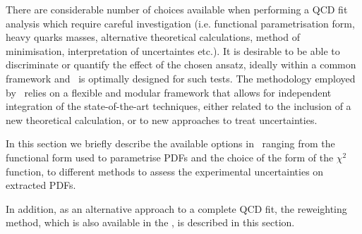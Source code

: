 



There are considerable number of choices available when performing a QCD fit analysis which require careful investigation (i.e. functional parametrisation form, heavy quarks masses, alternative theoretical calculations, method of minimisation, interpretation of uncertaintes etc.).
%
 It is desirable to be able to discriminate or quantify the effect of the chosen ansatz,  ideally within a common framework and 
\fitter\ is optimally designed for such tests.
%
The methodology employed by \fitter\  relies on a flexible and modular
framework that allows for independent integration of the state-of-the-art techniques, either related to the inclusion of a new theoretical calculation, or to new approaches to treat uncertainties. 
%

In this section we briefly describe the available options in \fitter\ ranging from the functional form used to parametrise PDFs and the choice of the form of the $\chi^2$ function, to different methods to assess the experimental uncertainties on extracted PDFs.

In addition, as an alternative approach to a complete QCD fit,  the reweighting
method, which is also available in the \fitter, is described in this section. 



